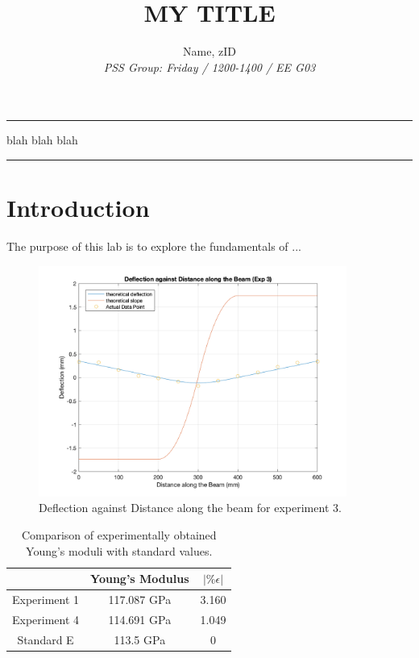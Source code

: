 \documentclass[12pt]{article}
\renewenvironment{abstract}
 {\quotation\small\noindent\rule{\linewidth}{.5pt}\par\smallskip
  {\centering\bfseries\abstractname\par}\medskip}
 {\par\noindent\rule{\linewidth}{.5pt}\endquotation}
\begin{document}
    \title{MY TITLE}
    \author{Name, zID\\\small \textit{PSS Group: Friday / 1200-1400 / EE G03}}
    \date{}
    \maketitle
    \begin{abstract}
       blah blah blah
    \end{abstract}

\section{Introduction}
\label{sec:Introduction}
    The purpose of this lab is to explore the fundamentals of ...

        \begin{figure}[h]
            \centering
            \includegraphics[width=0.9\textwidth]{delta_against_distance.png}
            \caption{\label{fig:delta_against_distance}Deflection against Distance along the beam for experiment 3.}
        \end{figure}
       
        \begin{table}[h]
            \centering
            \caption{\label{tab:Youngs_modulus_comparison} Comparison of experimentally obtained Young's moduli with standard values.}
            \begin{tabular}{|c|c|c|}\hline
                 & Young's Modulus & $|\%\epsilon|$ \\\hline
              Experiment 1 & 117.087 GPa & 3.160 \\\hline
              Experiment 4 & 114.691 GPa & 1.049 \\\hline
              Standard E \cite{common_values} & 113.5 GPa & 0 \\\hline
            \end{tabular}
        \end{table}
\end{document}
